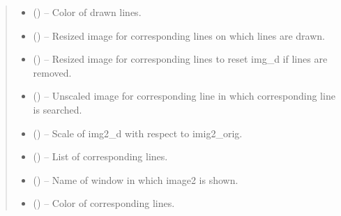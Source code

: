 \documentclass[letterpaper,10pt,english]{sphinxmanual}
\begin{document}
\begin{fulllineitems}
\begin{quote}
\begin{description}
\begin{itemize}
\item {} 
 () -- Color of drawn lines.

\item {} 
 () -- Resized image for corresponding lines on which lines are drawn.

\item {} 
 () -- Resized image for corresponding lines to reset img\_d if lines
are removed.

\item {} 
 () -- Unscaled image for corresponding line in which corresponding
line is searched.

\item {} 
 () -- Scale of img2\_d with respect to imig2\_orig.

\item {} 
 () -- List of corresponding lines.

\item {} 
 () -- Name of window in which image2 is shown.

\item {} 
 () -- Color of corresponding lines.

\end{itemize}

\end{description}\end{quote}

\end{fulllineitems}


\begin{fulllineitems}
\label{\detokenize{aaap_re_photo:aaap_re_photo.ps}}
\end{fulllineitems}

\end{document}
